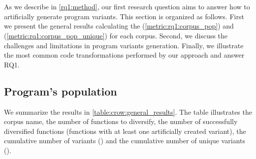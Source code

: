 
\section{\rqone}
\label{results:rq1}


\newcommand{\rossetapopulationunique}{2678}
\newcommand{\rossetapopulation}{809900}
\newcommand{\diversifiedsodium}{85}
\newcommand{\diversifiedqrcode}{32}
\newcommand{\libsodiumpopulation}{4272}
\newcommand{\libsodiumpopulationunique}{3805}
\newcommand{\qrpopulation}{6369}
\newcommand{\qrpopulationunique}{3314}


\newcommand{\allmewediversified}{\diversifiedsodium + \diversifiedqrcode}
\newcommand{\allmewepopulation}{\libpopulation + \qrpopulation}

As we describe in \autoref{rq1:method}, our first research question aims to answer how to artificially generate \wasm program variants. 
This section is organized as follows. First we present the general results calculating the \emph{\corpuspopulationsizename}(\autoref{metric:rq1:corpus_pop}) and \emph{\corpusuniquepopulationsizename}(\autoref{metric:rq1:corpus_pop_unique}) for each corpus. 
Second, we discuss the challenges and limitations in program variants generation. Finally, we illustrate the most common code transformations performed by our approach and answer RQ1.

\subsection{Program's population}

We summarize the results in \autoref{table:crow:general_results}.
The table illustrates the corpus name, the number of functions to diversify, the number of successfully diversified functions (functions with at least one artificially created variant), the cumulative number of variants (\emph{\corpuspopulationsizename}) and the cumulative number of unique variants (\emph{\corpusuniquepopulationsizename}).

